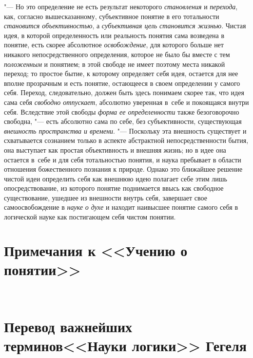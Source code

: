 "--- Но это определение не есть результат некоторого
{\em становления} и {\em перехода}, как,
согласно вышесказанному, субъективное понятие в его тотальности
{\em становится объективностью}, а {\em субъективная цель
становится жизнью}. Чистая идея, в которой определенность
или реальность понятия сама возведена в понятие, есть скорее абсолютное
{\em освобождение}, для
которого больше нет никакого непосредственного определения, которое не было
бы вместе с тем {\em положенным}
и понятием; в этой свободе не имеет поэтому места никакой
переход; то простое бытие, к которому определяет себя идея, остается для
нее вполне прозрачным и есть понятие, остающееся в своем определении у
самого себя. Переход, следовательно, должен быть здесь понимаем скорее так,
что идея сама себя {\em свободно
отпускает}, абсолютно уверенная в~себе и покоящаяся внутри
себя. Вследствие этой свободы {\em форма
ее определенности} также безоговорочно свободна, "---
есть абсолютно сама по себе, без субъективности, существующая
{\em внешность пространства и времени}.
"--- Поскольку эта внешность существует и схватывается
сознанием только в аспекте абстрактной непосредственности
бытия, она выступает как простая объективность и внешняя жизнь; но в идее
она остается в~себе и для себя тотальностью понятия, и наука пребывает в
области отношения божественного познания к природе. Однако это ближайшее
решение чистой идеи определить себя как внешнюю идею полагает себе этим
лишь опосредствование, из которого понятие поднимается ввысь как свободное
существование, ушедшее из внешности внутрь себя, завершает свое
самоосвобождение в {\em науке о духе}
и находит наивысшее понятие самого себя в логической науке
как постигающем себя чистом понятии.

\clearpage

\chapter[Примечания к <<Учению о понятии>>]{Примечания к <<Учению о понятии>>}

\printpagenotes

\clearpage\
\chapter[Перевод важнейших терминов <<Науки логики>> Гегеля]
{Перевод важнейших терминов\newline<<Науки логики>> Гегеля}

